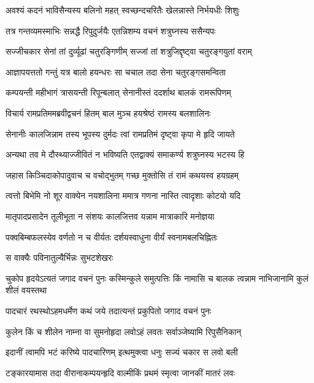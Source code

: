 \twolineshloka
{अवश्यं कदनं भाविसैन्यस्य बलिनो महत्}
{स्वच्छन्दचरितैः खेलन्नास्ते निर्भयधीः शिशुः}%

\twolineshloka
{तत्र गन्तव्यमस्माभिः सन्नद्धै रिपुदुर्जयैः}
{एतन्निशम्य वचनं शत्रुघ्नस्य ससैन्यपः}%

\twolineshloka
{सज्जीचकार सेनां तां दुर्व्यूढां चतुरङ्गिणीम्}
{सज्जां तां शत्रुजिद्दृष्ट्वा चतुरङ्गयुतां वराम्}%

\twolineshloka
{आज्ञापयत्ततो गन्तुं यत्र बालो हयन्धरः}
{सा चचाल तदा सेना चतुरङ्गसमन्विता}%

\twolineshloka
{कम्पयन्ती महीभागं त्रासयन्ती रिपून्बलात्}
{सेनानीस्तं ददर्शाथ बालकं रामरूपिणम्}%

\twolineshloka
{विचार्य रामप्रतिममब्रवीद्वचनं हितम्}
{बाल मुञ्च हयश्रेष्ठं रामस्य बलशालिनः}%

\twolineshloka
{सेनानीः कालजिन्नाम तस्य भूपस्य दुर्मदः}
{त्वां रामप्रतिमं दृष्ट्वा कृपा मे हृदि जायते}%

\twolineshloka
{अन्यथा तव मे दौस्थ्याज्जीवितं न भविष्यति}
{एतद्वाक्यं समाकर्ण्य शत्रुघ्नस्य भटस्य हि}%

\twolineshloka
{जहास किञ्चिदाकोपादुवाच च वचोद्भुतम्}
{गच्छ मुक्तोसि तं रामं कथयस्व हयग्रहम्}%

\twolineshloka
{त्वत्तो बिभेमि नो शूर वाक्येन नयशालिना}
{ममात्र गणना नास्ति त्वादृशाः कोटयो यदि}%

\twolineshloka
{मातृपादप्रसादेन तूलीभूता न संशयः}
{कालजित्तव यन्नाम मात्राकारि मनोज्ञया}%

\twolineshloka
{पक्वबिम्बफलस्येव वर्णतो न च वीर्यतः}
{दर्शयस्वाधुना वीर्यं स्वनामबलचिह्नितः}%



\onelineshloka
{स वाक्यैः पविनातुल्यैर्भिन्नः सुभटशेखरः}%


\threelineshloka
{चुकोप हृदयेऽत्यतं जगाद वचनं पुनः}
{कस्मिन्कुले समुत्पत्तिः किं नामासि च बालक}
{त्वन्नाम नाभिजानामि कुलं शीलं वयस्तथा}%

\twolineshloka
{पादचारं रथस्थोऽहमधर्मेण कथं जये}
{तदात्यन्तं प्रकुपितो जगाद वचनं पुनः}%

\twolineshloka
{कुलेन किं च शीलेन नाम्ना वा सुमनोहृदा}
{लवोऽहं लवतः सर्वाञ्जेष्यामि रिपुसैनिकान्}%

\twolineshloka
{इदानीं त्वामपि भटं करिष्ये पादचारिणम्}
{इत्थमुक्त्वा धनुः सज्यं चकार स लवो बली}%

\twolineshloka
{टङ्कारयामास तदा वीरानाकम्पयन्हृदि}
{वाल्मीकिं प्रथमं स्मृत्वा जानकीं मातरं लवः}%

